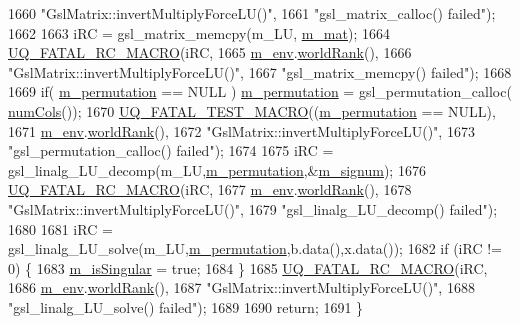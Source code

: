 \begin{DoxyCode}
1660                       \textcolor{stringliteral}{"GslMatrix::invertMultiplyForceLU()"},
1661                       \textcolor{stringliteral}{"gsl\_matrix\_calloc() failed"});
1662   
1663   iRC = gsl\_matrix\_memcpy(m\_LU, \hyperlink{class_q_u_e_s_o_1_1_gsl_matrix_a2cac0bd065e280a06445f944d5f3e3b3}{m\_mat});
1664   \hyperlink{_defines_8h_aa9107e1a9a5197371a412db3fa349988}{UQ\_FATAL\_RC\_MACRO}(iRC,
1665                     \hyperlink{class_q_u_e_s_o_1_1_matrix_a247fb0fc0b87fecdee054bb4660b68e8}{m\_env}.\hyperlink{class_q_u_e_s_o_1_1_base_environment_a78b57112bbd0e6dd0e8afec00b40ffa7}{worldRank}(),
1666                     \textcolor{stringliteral}{"GslMatrix::invertMultiplyForceLU()"},
1667                     \textcolor{stringliteral}{"gsl\_matrix\_memcpy() failed"});
1668   
1669   \textcolor{keywordflow}{if}( \hyperlink{class_q_u_e_s_o_1_1_gsl_matrix_a673277a250dca216e0e414110f63a9af}{m\_permutation} == NULL ) \hyperlink{class_q_u_e_s_o_1_1_gsl_matrix_a673277a250dca216e0e414110f63a9af}{m\_permutation} = gsl\_permutation\_calloc(
      \hyperlink{class_q_u_e_s_o_1_1_gsl_matrix_ad5005f168fe030468e834776afb1859b}{numCols}());
1670   \hyperlink{_defines_8h_a56d63d18d0a6d45757de47fcc06f574d}{UQ\_FATAL\_TEST\_MACRO}((\hyperlink{class_q_u_e_s_o_1_1_gsl_matrix_a673277a250dca216e0e414110f63a9af}{m\_permutation} == NULL),
1671                       \hyperlink{class_q_u_e_s_o_1_1_matrix_a247fb0fc0b87fecdee054bb4660b68e8}{m\_env}.\hyperlink{class_q_u_e_s_o_1_1_base_environment_a78b57112bbd0e6dd0e8afec00b40ffa7}{worldRank}(),
1672                       \textcolor{stringliteral}{"GslMatrix::invertMultiplyForceLU()"},
1673                       \textcolor{stringliteral}{"gsl\_permutation\_calloc() failed"});
1674   
1675   iRC = gsl\_linalg\_LU\_decomp(m\_LU,\hyperlink{class_q_u_e_s_o_1_1_gsl_matrix_a673277a250dca216e0e414110f63a9af}{m\_permutation},&\hyperlink{class_q_u_e_s_o_1_1_gsl_matrix_a591c6afd472ae02dd79e3a109ded4d51}{m\_signum}); 
1676   \hyperlink{_defines_8h_aa9107e1a9a5197371a412db3fa349988}{UQ\_FATAL\_RC\_MACRO}(iRC,
1677                     \hyperlink{class_q_u_e_s_o_1_1_matrix_a247fb0fc0b87fecdee054bb4660b68e8}{m\_env}.\hyperlink{class_q_u_e_s_o_1_1_base_environment_a78b57112bbd0e6dd0e8afec00b40ffa7}{worldRank}(),
1678                     \textcolor{stringliteral}{"GslMatrix::invertMultiplyForceLU()"},
1679                     \textcolor{stringliteral}{"gsl\_linalg\_LU\_decomp() failed"});
1680 
1681   iRC = gsl\_linalg\_LU\_solve(m\_LU,\hyperlink{class_q_u_e_s_o_1_1_gsl_matrix_a673277a250dca216e0e414110f63a9af}{m\_permutation},b.data(),x.data()); 
1682   \textcolor{keywordflow}{if} (iRC != 0) \{
1683     \hyperlink{class_q_u_e_s_o_1_1_gsl_matrix_aa83274d327bb4e668bdeec51e2466c4e}{m\_isSingular} = \textcolor{keyword}{true};
1684   \}
1685   \hyperlink{_defines_8h_aa9107e1a9a5197371a412db3fa349988}{UQ\_FATAL\_RC\_MACRO}(iRC,
1686                     \hyperlink{class_q_u_e_s_o_1_1_matrix_a247fb0fc0b87fecdee054bb4660b68e8}{m\_env}.\hyperlink{class_q_u_e_s_o_1_1_base_environment_a78b57112bbd0e6dd0e8afec00b40ffa7}{worldRank}(),
1687                     \textcolor{stringliteral}{"GslMatrix::invertMultiplyForceLU()"},
1688                     \textcolor{stringliteral}{"gsl\_linalg\_LU\_solve() failed"});
1689 
1690   \textcolor{keywordflow}{return};
1691 \}
\end{DoxyCode}
